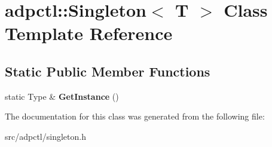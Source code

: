 \hypertarget{classadpctl_1_1Singleton}{}\section{adpctl\+:\+:Singleton$<$ T $>$ Class Template Reference}
\label{classadpctl_1_1Singleton}
\subsection*{Static Public Member Functions}
\begin{DoxyCompactItemize}
\item 
\mbox{\label{classadpctl_1_1Singleton_af082cd0385253eb507206f2c8b85a398}} 
static Type \& {\bfseries Get\+Instance} ()
\end{DoxyCompactItemize}


The documentation for this class was generated from the following file\+:\begin{DoxyCompactItemize}
\item 
src/adpctl/singleton.\+h\end{DoxyCompactItemize}

